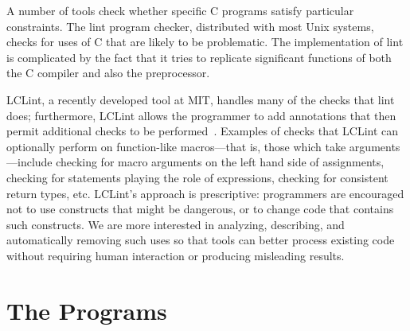 A number of tools check whether specific C programs
satisfy particular constraints.  The lint program checker, distributed
with most Unix systems, checks for uses of C that are likely to be
problematic.  The implementation of lint is complicated by the fact
that it tries to replicate significant functions of both the C
compiler and also the preprocessor.

LCLint, a recently developed tool
at MIT, handles many of the checks that lint does; furthermore, LCLint
allows the programmer to add annotations that then permit additional
checks to be performed~\cite{Evans-fse94,Evans-pldi96}.
Examples of checks that LCLint can optionally perform on function-like
macros---that is, those which take arguments---include checking for
macro arguments on the left hand side of assignments, checking for statements
playing the role of expressions, checking for consistent return types, etc.
LCLint's approach is prescriptive: programmers are encouraged not to use
constructs that might be dangerous, or to change code that contains such
constructs.  We are more interested in analyzing, describing, and
automatically removing such uses so that tools can better process existing
code without requiring human interaction or producing misleading results.


\section{The Programs}\label{sec:gathering}


